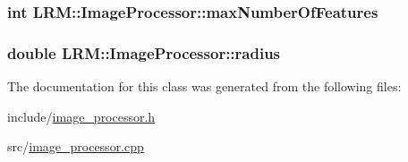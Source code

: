 \hypertarget{classLRM_1_1ImageProcessor_afcdba0a2c3377e8d89d8abb42632bf3a}{
\subsubsection[{max\-Number\-Of\-Features}]{\setlength{\rightskip}{0pt plus 5cm}int {\bf \-L\-R\-M\-::\-Image\-Processor\-::max\-Number\-Of\-Features}}}\label{classLRM_1_1ImageProcessor_afcdba0a2c3377e8d89d8abb42632bf3a}
\hypertarget{classLRM_1_1ImageProcessor_a46e10168106b028e29042dbe8e13f83e}{
\subsubsection[{radius}]{\setlength{\rightskip}{0pt plus 5cm}double {\bf \-L\-R\-M\-::\-Image\-Processor\-::radius}}}\label{classLRM_1_1ImageProcessor_a46e10168106b028e29042dbe8e13f83e}


\-The documentation for this class was generated from the following files\-:\begin{DoxyCompactItemize}
\item 
include/\hyperlink{image__processor_8h}{image\-\_\-processor.\-h}\item 
src/\hyperlink{image__processor_8cpp}{image\-\_\-processor.\-cpp}\end{DoxyCompactItemize}
